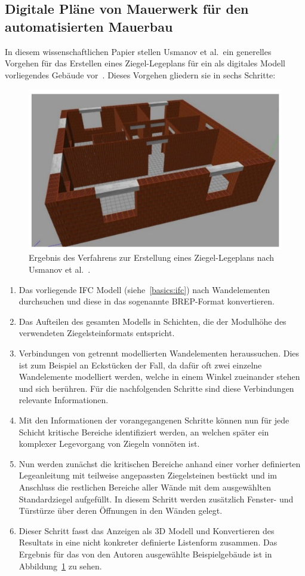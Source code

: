 \subsection{Digitale Pläne von Mauerwerk für den automatisierten Mauerbau}\label{related:digital_plan_of_brickwork_layout}
In diesem wissenschaftlichen Papier stellen Usmanov et al.\ ein generelles Vorgehen für das Erstellen eines Ziegel-Legeplans für ein als digitales Modell vorliegendes Gebäude vor~\cite{Usmanov2021}.
Dieses Vorgehen gliedern sie in sechs Schritte:
\begin{figure}[h!]
    \centering
    \includegraphics[width=0.5\columnwidth]{fig/sustainability1303905g004.png}
    \caption{Ergebnis des Verfahrens zur Erstellung eines Ziegel-Legeplans nach Usmanov et al.~\cite{Usmanov2021}.}\label{fig:related:usmanov}
\end{figure}
\begin{enumerate}
\item Das vorliegende IFC Modell (siehe~\ref{basics:ifc}) nach Wandelementen durchsuchen und diese in das sogenannte BREP-Format konvertieren.
\item Das Aufteilen des gesamten Modells in Schichten, die der Modulhöhe des verwendeten Ziegelsteinformats entspricht.
\item Verbindungen von getrennt modellierten Wandelementen heraussuchen. 
Dies ist zum Beispiel an Eckstücken der Fall, da dafür oft zwei einzelne Wandelemente modelliert werden, welche in einem Winkel zueinander stehen und sich berühren. 
Für die nachfolgenden Schritte sind diese Verbindungen relevante Informationen.
\item Mit den Informationen der vorangegangenen Schritte können nun für jede Schicht kritische Bereiche identifiziert werden, an welchen später ein komplexer Legevorgang von Ziegeln vonnöten ist.
\item Nun werden zunächst die kritischen Bereiche anhand einer vorher definierten Legeanleitung mit teilweise angepassten Ziegelsteinen bestückt und im Anschluss die restlichen Bereiche aller Wände mit dem ausgewählten Standardziegel aufgefüllt. 
In diesem Schritt werden zusätzlich Fenster- und Türstürze über deren Öffnungen in den Wänden gelegt.
\item Dieser Schritt fasst das Anzeigen als 3D Modell und Konvertieren des Resultats in eine nicht konkreter definierte Listenform zusammen. 
Das Ergebnis für das von den Autoren ausgewählte Beispielgebäude ist in Abbildung~\ref{fig:related:usmanov} zu sehen. 
\end{enumerate}

